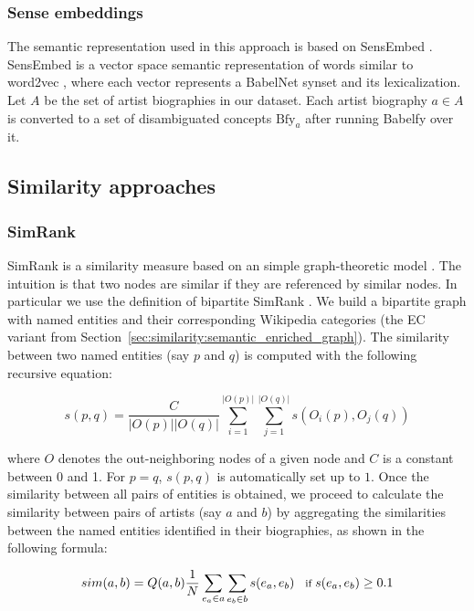 \subsubsection{Sense embeddings}\label{sec:similarity:sense_embeddings}
The semantic representation used in this approach is based on SensEmbed \cite{Iacobaccietal2015}. SensEmbed is a vector space semantic representation of words similar to word2vec \cite{Mikolovetal2013},
where each vector represents a BabelNet synset and its lexicalization. Let $A$ be the set of artist biographies in our dataset. Each artist biography $a \in A$ is converted to a set of disambiguated concepts $\text{Bfy}_{a}$ after running Babelfy over it.

\subsection{Similarity approaches}

\subsubsection{SimRank} %

SimRank is a similarity measure based on an simple graph-theoretic model \cite{jeh2002simrank}. The intuition is that two nodes are similar if they are referenced by similar nodes. In particular we use the definition of bipartite SimRank \cite{jeh2002simrank}. We build a bipartite graph with named entities and their corresponding Wikipedia categories (the EC variant from Section~\ref{sec:similarity:semantic_enriched_graph}). The similarity between two named entities (say $p$ and $q$) is computed with the following recursive equation:

\begin{equation}
s(p,q) = \frac{C}{|O(p)||O(q)|} \sum_{i=1}^{|O(p)|} \sum_{j=1}^{|O(q)|} s(O_i(p), O_j(q))
\end{equation}

where $O$ denotes the out-neighboring nodes of a given node and $C$ is a constant between 0 and 1. For $p = q$, $s(p,q)$ is automatically set up to $1$.
Once the similarity between all pairs of entities is obtained, we proceed to calculate the similarity between pairs of artists (say $a$ and $b$) by aggregating the similarities between the named entities identified in their biographies, as shown in the following formula:

\begin{equation}
\footnotesize
sim(a,b) = Q(a,b) \frac{1}{N} \sum_{e_a \in a} \sum_{e_b \in b} s(e_a, e_b)\quad \text{if}\ s(e_a, e_b) \geq 0.1
\end{equation}

